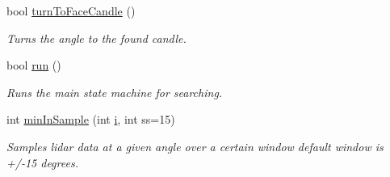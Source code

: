 \begin{DoxyCompactItemize}
\item 
bool \hyperlink{classSearcher_a557322c3deb361501d199b541ca7fdd3}{turn\-To\-Face\-Candle} ()
\begin{DoxyCompactList}\small\item\em Turns the angle to the found candle. \end{DoxyCompactList}\item 
bool \hyperlink{classSearcher_aaea092416ef215eb96f46ef3d6f1b581}{run} ()
\begin{DoxyCompactList}\small\item\em Runs the main state machine for searching. \end{DoxyCompactList}\item 
int \hyperlink{classSearcher_a72f0af23bc595eaa70e4fb017eac8d79}{min\-In\-Sample} (int \hyperlink{LidarBenchmark_8cpp_acb559820d9ca11295b4500f179ef6392}{i}, int ss=15)
\begin{DoxyCompactList}\small\item\em Samples lidar data at a given angle over a certain window default window is +/-\/15 degrees. \end{DoxyCompactList}\end{DoxyCompactItemize}
